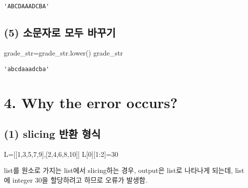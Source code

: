 \documentclass[
  letterpaper,
  DIV=11,
  numbers=noendperiod]{scrreprt}
\newenvironment{Shaded}{\begin{snugshade}}{\end{snugshade}}
\newcommand{\DecValTok}[1]{\textcolor[rgb]{0.68,0.00,0.00}{#1}}
\newcommand{\NormalTok}[1]{\textcolor[rgb]{0.00,0.23,0.31}{#1}}
\newcommand{\OperatorTok}[1]{\textcolor[rgb]{0.37,0.37,0.37}{#1}}
\begin{document}
\begin{verbatim}
'ABCDAAADCBA'
\end{verbatim}

\subsection*{(5) 소문자로 모두
바꾸기}\label{uxc18cuxbb38uxc790uxb85c-uxbaa8uxb450-uxbc14uxafb8uxae30}

\begin{Shaded}
\begin{Highlighting}[]
\NormalTok{grade\_str}\OperatorTok{=}\NormalTok{grade\_str.lower()}
\NormalTok{grade\_str}
\end{Highlighting}
\end{Shaded}

\begin{verbatim}
'abcdaaadcba'
\end{verbatim}

\section*{4. Why the error occurs?}\label{why-the-error-occurs-1}


\subsection*{(1) slicing 반환
형식}\label{slicing-uxbc18uxd658-uxd615uxc2dd}

\begin{Shaded}
\begin{Highlighting}[]
\NormalTok{L}\OperatorTok{=}\NormalTok{[[}\DecValTok{1}\NormalTok{,}\DecValTok{3}\NormalTok{,}\DecValTok{5}\NormalTok{,}\DecValTok{7}\NormalTok{,}\DecValTok{9}\NormalTok{],[}\DecValTok{2}\NormalTok{,}\DecValTok{4}\NormalTok{,}\DecValTok{6}\NormalTok{,}\DecValTok{8}\NormalTok{,}\DecValTok{10}\NormalTok{]]}
\NormalTok{L[}\DecValTok{0}\NormalTok{][}\DecValTok{1}\NormalTok{:}\DecValTok{2}\NormalTok{]}\OperatorTok{=}\DecValTok{30}
\end{Highlighting}
\end{Shaded}

list를 원소로 가지는 list에서 slicing하는 경우, output은 list로 나타나게
되는데, list에 integer 30을 할당하려고 하므로 오류가 발생함.
\end{document}
